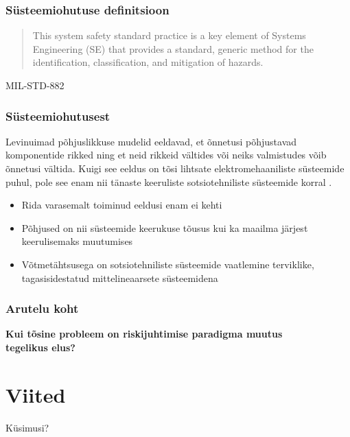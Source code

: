 \begin{frame}[fragile]
  \frametitle{Süsteemiohutuse definitsioon}
	\begin{center}
		\begin{quote}
			This system safety standard practice is a key element of Systems Engineering (SE) that provides a standard, generic method for the identification, classification, and mitigation of hazards.
		\end{quote}
	\end{center}
			MIL-STD-882
	
\end{frame}

\begin{frame}[fragile]
  \frametitle{Süsteemiohutusest}
	Levinuimad põhjuslikkuse mudelid eeldavad, et õnnetusi põhjustavad komponentide rikked ning et neid rikkeid vältides või neiks valmistudes võib õnnetusi vältida. Kuigi see eeldus on tõsi lihtsate elektromehaaniliste süsteemide puhul, pole see enam nii tänaste keeruliste sotsiotehniliste süsteemide korral \cite{leveson2011engineering}.
	\begin{itemize}
		\item Rida varasemalt toiminud eeldusi enam ei kehti
		\item Põhjused on nii süsteemide keerukuse tõusus kui ka maailma järjest keerulisemaks muutumises
		\item Võtmetähtsusega on sotsiotehniliste süsteemide vaatlemine terviklike, tagasisidestatud mittelineaarsete süsteemidena
	\end{itemize}
\end{frame}


\begin{frame}[fragile]
  \frametitle{Arutelu koht}
		\begin{center}
			\textbf{Kui tõsine probleem on riskijuhtimise paradigma muutus \\tegelikus elus?}
		\end{center}
\end{frame}


\section{Viited}

\begin{frame}[t,allowframebreaks,]
  	
	 

\end{frame}

\begin{frame}[plain]
	\begin{center}Küsimusi?\end{center}
\end{frame}


